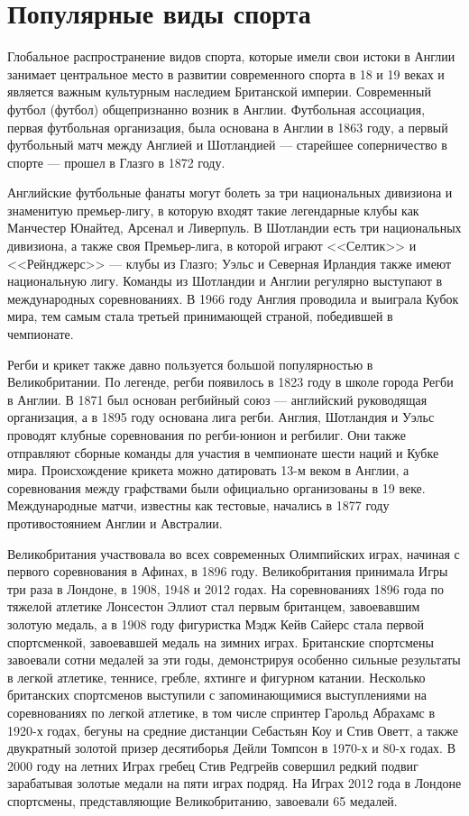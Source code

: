 \section{Популярные виды спорта}

Глобальное распространение видов спорта, которые имели свои истоки в Англии занимает центральное место в развитии современного спорта в 18 и 19 веках и является важным культурным наследием Британской империи. Современный футбол (футбол) общепризнанно возник в Англии. Футбольная ассоциация, первая футбольная организация, была основана в Англии в 1863 году, а первый футбольный матч между Англией и Шотландией — старейшее соперничество в спорте — прошел в Глазго в 1872 году.

Английские футбольные фанаты могут болеть за три национальных дивизиона и знаменитую премьер-лигу, в которую входят такие легендарные клубы как Манчестер Юнайтед, Арсенал и Ливерпуль. В Шотландии есть три национальных дивизиона, а также своя Премьер-лига, в которой играют <<Селтик>> и <<Рейнджерс>> --- клубы из Глазго; Уэльс и Северная Ирландия также имеют национальную лигу. Команды из Шотландии и Англии регулярно выступают в международных соревнованиях. В 1966 году Англия проводила и выиграла Кубок мира, тем самым стала третьей принимающей страной, победившей в чемпионате.

Регби и крикет также давно пользуется большой популярностью в Великобритании. По легенде, регби появилось в 1823 году в школе города Регби в Англии. В 1871 был основан регбийный союз --- английский руководящая организация, а в 1895 году основана лига регби. Англия, Шотландия и Уэльс проводят клубные соревнования по регби-юнион и регбилиг. Они также отправляют сборные команды для участия в чемпионате шести наций и Кубке мира. Происхождение крикета можно датировать 13-м веком в Англии, а соревнования между графствами были официально организованы в 19 веке. Международные матчи, известны как тестовые, начались в 1877 году противостоянием Англии и Австралии.

Великобритания участвовала во всех современных Олимпийских играх, начиная с первого соревнования в Афинах, в 1896 году. Великобритания принимала Игры три раза в Лондоне, в 1908, 1948 и 2012 годах. На соревнованиях 1896 года по тяжелой атлетике Лонсестон Эллиот стал первым британцем, завоевавшим золотую медаль, а в 1908 году фигуристка Мэдж Кейв Сайерс стала первой спортсменкой, завоевавшей медаль на зимних играх. Британские спортсмены завоевали сотни медалей за эти годы, демонстрируя особенно сильные результаты в легкой атлетике, теннисе, гребле, яхтинге и фигурном катании. Несколько британских спортсменов выступили с запоминающимися выступлениями на соревнованиях по легкой атлетике, в том числе спринтер Гарольд Абрахамс в 1920-х годах, бегуны на средние дистанции Себастьян Коу и Стив Оветт, а также двукратный золотой призер десятиборья Дейли Томпсон в 1970-х и 80-х годах. В 2000 году на летних Играх гребец Стив Редгрейв совершил редкий подвиг зарабатывая золотые медали на пяти играх подряд. На Играх 2012 года в Лондоне спортсмены, представляющие Великобританию, завоевали 65 медалей.

